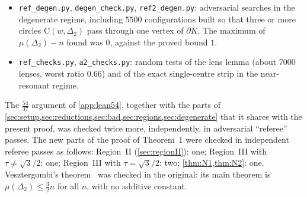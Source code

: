 \documentclass[11pt]{amsart}
\theoremstyle{definition}
\theoremstyle{remark}
\newcommand{\Dt}{\Delta_2}
\newcommand{\mult}{\mu}
\newcommand{\Cc}{\mathrm{C}}      %
\begin{document}
\begin{itemize}[leftmargin=2em]
\item \texttt{ref\_degen.py}, \texttt{degen\_check.py}, \texttt{ref2\_degen.py}: adversarial searches in the degenerate regime, including $5500$ configurations built so that three or more circles $\Cc(w,\Dt)$ pass through one vertex of $\partial K$. The maximum of $\mult(\Dt)-n$ found was $0$, against the proved bound $1$.
\item \texttt{ref\_checks.py}, \texttt{a2\_checks.py}: random tests of the lens lemma (about $7000$ lenses, worst ratio $0.66$) and of the exact single-centre strip in the near-resonant regime.
\end{itemize}
The $\frac{54}{37}$ argument of \cref{app:lean54}, together with the parts of \cref{sec:setup,sec:reductions,sec:bad,sec:regions,sec:degenerate} that it shares with the present proof, was checked twice more, independently, in adversarial ``referee'' passes. The new parts of the proof of Theorem~1 were checked in independent referee passes as follows: Region~II (\cref{sec:regionII}): one; Region~III with $\tau\neq\sqrt3/2$: one; Region~III with $\tau=\sqrt3/2$: two; \cref{thm:N1,thm:N2}: one. Vesztergombi's theorem~\cite{Ve87} was checked in the original: its main theorem is $\mult(\Dt)\le\frac32n$ for all $n$, with no additive constant.
\end{document}
